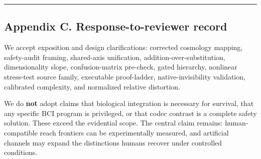 \documentclass[
  11pt,
]{article}
\begin{document}
\begin{center}\rule{0.5\linewidth}{0.5pt}\end{center}

\subsection{Appendix C. Response-to-reviewer
record}\label{appendix-c.-response-to-reviewer-record}

We accept exposition and design clarifications:
corrected cosmology mapping, safety-audit
framing, shared-axis unification,
addition-over-substitution, dimensionality
slope, confusion-matrix pre-check, gated
hierarchy, nonlinear stress-test source family,
executable proof-ladder, native-invisibility
validation, calibrated complexity, and
normalized relative distortion.

We do \textbf{not} adopt claims that biological
integration is necessary for survival, that any
specific BCI program is privileged, or that
codec contrast is a complete safety solution.
These exceed the evidential scope. The central
claim remains: human-compatible reach frontiers
can be experimentally measured, and artificial
channels may expand the distinctions humans
recover under controlled conditions.
\end{document}
